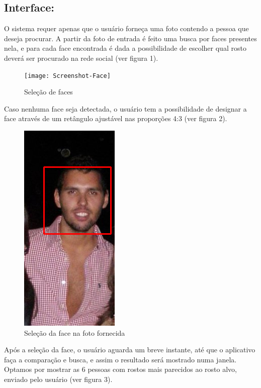 \documentclass[10pt,a4paper]{article}
\begin{document}
\subsection*{Interface:}
O sistema requer apenas que o usuário forneça uma foto contendo a pessoa que deseja procurar. A partir da foto de entrada é feito uma busca por faces presentes nela, e para cada face encontrada é dada a possibilidade de escolher qual rosto deverá ser procurado na rede social (ver figura 1). 

\begin{figure}[h!]
  \begin{center}
    \texttt{[image: Screenshot-Face]}
    \caption{Seleção de faces}
  \end{center}
\end{figure}

Caso nenhuma face seja detectada, o usuário tem a possibilidade de
designar a face através de um retângulo ajustável nas proporções 4:3
(ver figura 2).

\begin{figure}[h!]
  \begin{center}
    \includegraphics[scale=0.4]{samephoto}
    \caption{ Seleção da face na foto fornecida}
  \end{center}
\end{figure}

Após a seleção da face, o usuário aguarda um breve instante, até que o aplicativo faça a comparação e busca, e assim o resultado será mostrado numa janela. Optamos por mostrar as 6 pessoas com rostos mais parecidos ao rosto alvo, enviado pelo usuário (ver figura 3).
\end{document}
